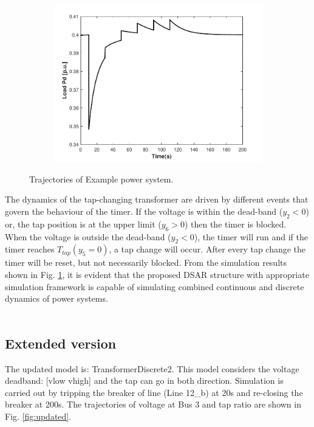 \documentclass{article}	%
\begin{document}
\begin{figure}[H]
\begin{subfigure}[b]{0.5\textwidth}
    \includegraphics[width=\textwidth]{pd}
    \end{subfigure}
  \caption{Trajectories of Example power system.}
  \label{fig:tps}
\end{figure}
%
%
%
The dynamics of the tap-changing transformer are driven by different events that govern the behaviour of the timer. If the voltage is within the dead-band ($y_2<0$) or, the tap position is at the upper limit ($y_6>0$) then the timer is blocked. When the voltage is outside the dead-band ($y_2<0$), the timer will run and if the timer reaches $T_{tap} (y_5=0)$, a tap change will occur. After every tap change the timer will be reset, but not necessarily blocked. From the simulation results shown in Fig. \ref{fig:tps}, it is evident that the proposed DSAR structure with appropriate simulation framework is capable of simulating combined continuous and discrete dynamics of power systems.\\
\\



\subsection{Extended version}

The updated model is: TransformerDiscrete2. This model considers the voltage deadband: [vlow vhigh] and the tap can go in both direction. Simulation is carried out by tripping the breaker of line (Line 12\_b) at 20s and re-closing the breaker at 200s. The trajectories of voltage at Bus 3 and tap ratio are shown in Fig. \ref{fig:updated}.
\end{document}
